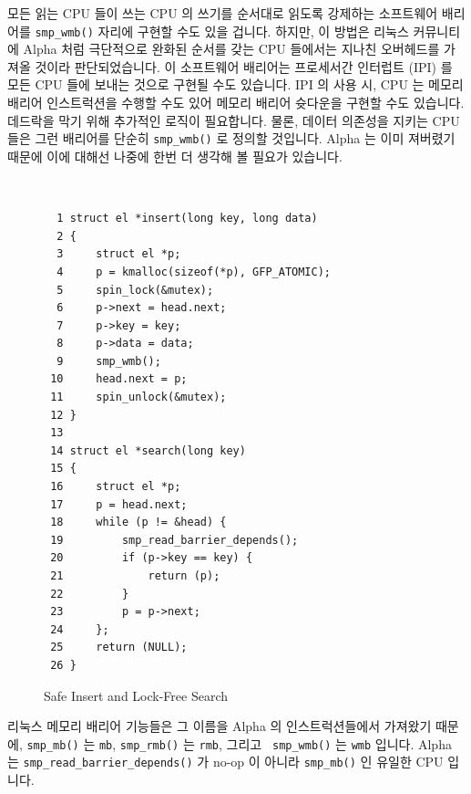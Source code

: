 모든 읽는 CPU 들이 쓰는 CPU 의 쓰기를 순서대로 읽도록 강제하는 소프트웨어
배리어를 {\tt smp\_wmb()} 자리에 구현할 수도 있을 겁니다.
하지만, 이 방법은 리눅스 커뮤니티에 Alpha 처럼 극단적으로 완화된 순서를 갖는
CPU 들에서는 지나친 오버헤드를 가져올 것이라 판단되었습니다.
이 소프트웨어 배리어는 프로세서간 인터럽트 (IPI) 를 모든 CPU 들에 보내는 것으로
구현될 수도 있습니다.
IPI 의 사용 시, CPU 는 메모리 배리어 인스트럭션을 수행할 수도 있어 메모리
배리어 슛다운을 구현할 수도 있습니다.
데드락을 막기 위해 추가적인 로직이 필요합니다.
물론, 데이터 의존성을 지키는 CPU 들은 그런 배리어를 단순히 {\tt smp\_wmb()} 로
정의할 것입니다.
Alpha 는 이미 져버렸기 때문에 이에 대해선 나중에 한번 더 생각해 볼 필요가
있습니다.

\begin{figure}
{\tt \scriptsize
\begin{verbatim}
  1 struct el *insert(long key, long data)
  2 {
  3     struct el *p;
  4     p = kmalloc(sizeof(*p), GFP_ATOMIC);
  5     spin_lock(&mutex);
  6     p->next = head.next;
  7     p->key = key;
  8     p->data = data;
  9     smp_wmb();
 10     head.next = p;
 11     spin_unlock(&mutex);
 12 }
 13
 14 struct el *search(long key)
 15 {
 16     struct el *p;
 17     p = head.next;
 18     while (p != &head) {
 19         smp_read_barrier_depends();
 20         if (p->key == key) {
 21             return (p);
 22         }
 23         p = p->next;
 24     };
 25     return (NULL);
 26 }
\end{verbatim}
}
\caption{Safe Insert and Lock-Free Search}
\label{fig:app:whymb:Safe Insert and Lock-Free Search}
\end{figure}

리눅스 메모리 배리어 기능들은 그 이름을 Alpha 의 인스트럭션들에서 가져왔기
때문에, {\tt smp\_mb()} 는 {\tt mb}, {\tt smp\_rmb()} 는 {\tt rmb}, 그리고 {\tt
smp\_wmb()} 는 {\tt wmb} 입니다.
Alpha 는 {\tt smp\_read\_barrier\_depends()} 가 no-op 이 아니라 {\tt smp\_mb()}
인 유일한 CPU 입니다.
\iffalse

